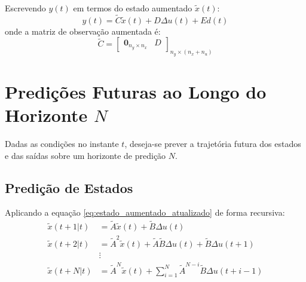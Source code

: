 \documentclass[12pt]{article}
\begin{document}
Escrevendo $y(t)$ em termos do estado aumentado $\tilde{x}(t)$:
\begin{equation}
\label{eq:saida_aumentada}
y(t) = \tilde{C} \tilde{x}(t) + D \Delta u(t) + E d(t)
\end{equation}
onde a matriz de observação aumentada é:
\begin{equation}
\tilde{C} = \begin{bmatrix} \bm{0}_{n_y \times n_x} & D \end{bmatrix}_{n_y \times (n_x+n_u)}
\end{equation}

\section{Predições Futuras ao Longo do Horizonte $N$}

Dadas as condições no instante $t$, deseja-se prever a trajetória futura dos estados e das saídas sobre um horizonte de predição $N$.

\subsection{Predição de Estados}
Aplicando a equação \eqref{eq:estado_aumentado_atualizado} de forma recursiva:
\begin{align}
\tilde{x}(t+1|t) &= \tilde{A} \tilde{x}(t) + \tilde{B} \Delta u(t) \nonumber \\
\tilde{x}(t+2|t) &= \tilde{A}^2 \tilde{x}(t) + \tilde{A}\tilde{B} \Delta u(t) + \tilde{B} \Delta u(t+1) \nonumber \\
&\vdots \nonumber \\
\tilde{x}(t+N|t) &= \tilde{A}^N \tilde{x}(t) + \sum_{i=1}^N \tilde{A}^{N-i} \tilde{B} \Delta u(t+i-1)
\end{align}
\end{document}
